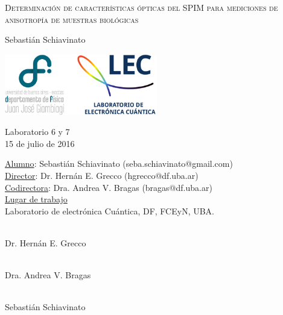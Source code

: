 \documentclass[12pt,a4paper]{article}
\begin{document}
    \begin{titlepage}
        
        \begin{center}
        {\scshape\Huge Determinación de características ópticas del SPIM para mediciones de anisotropía de muestras biológicas \par}
        \vspace{1cm}
        {\Large Sebastián Schiavinato \par}
        \vfill

        \includegraphics[width=0.5\textwidth]{fig/logo}
        
        \vfill
        \Large Laboratorio 6 y 7 \\
        \large 15 de julio de 2016
        \end{center}
        
        \newpage
        \pagestyle{empty}
        \begin{center}
        \large
        \noindent \underline{Alumno}: Sebastián Schiavinato (seba.schiavinato@gmail.com) \\
        \underline{Director}:   Dr. Hernán E. Grecco (hgrecco@df.uba.ar)\\
        \underline{Codirectora}: Dra. Andrea V. Bragas (bragas@df.uba.ar)\\
        \vspace{1em}
        \underline{Lugar de trabajo}\\ Laboratorio de electrónica Cuántica, DF, FCEyN, UBA.
        \end{center}
        \vspace{5em}
        \begin{minipage}{.3\textwidth}
            \begin{flushleft}
            \centering
            \hrulefill\\
            Dr. Hernán E. Grecco 
            \end{flushleft}
        \end{minipage}
        \hfill
        \begin{minipage}{.3\textwidth}
            \begin{center}
            \hrulefill\\
            Dra. Andrea V. Bragas
            \end{center}
        \end{minipage}
        \hfill
        \begin{minipage}{.3\textwidth}
            \begin{flushright}
            \centering
            \hrulefill\\
            Sebastián Schiavinato
            \end{flushright}
        \end{minipage}
    \end{titlepage}
\end{document}
